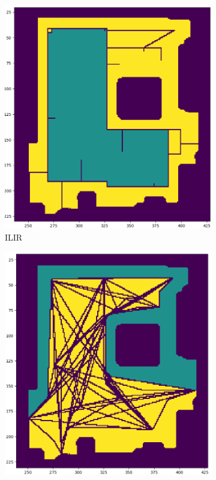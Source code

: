\begin{figure}[h]
    \captionsetup[subfigure]{justification=centering}
    \centering
    \begin{subfigure}{.25\textwidth}
      \centering
      \includegraphics[width=\textwidth]{figures/60_results/room2_disturbance_ilir.png}
      \caption{ILIR}
    \end{subfigure}%
    \begin{subfigure}{.25\textwidth}
      \centering
      \includegraphics[width=\textwidth]{figures/60_results/room2_disturbance_astar.png}

\end{subfigure}
\end{figure}
